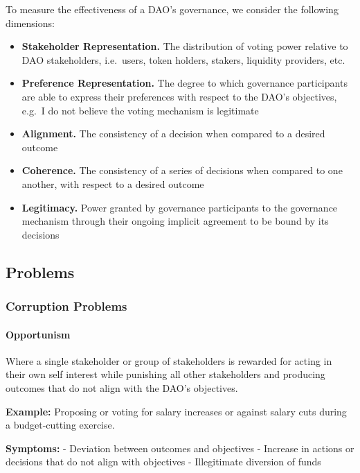 \documentclass[
]{article}
\providecommand{\tightlist}{%
  \setlength{\itemsep}{0pt}\setlength{\parskip}{0pt}}
\begin{document}
To measure the effectiveness of a DAO's governance, we consider the
following dimensions:

\begin{itemize}
\tightlist
\item
  \textbf{Stakeholder Representation.} The distribution of voting power
  relative to DAO stakeholders, i.e.~users, token holders, stakers,
  liquidity providers, etc.
\item
  \textbf{Preference Representation.} The degree to which governance
  participants are able to express their preferences with respect to the
  DAO's objectives, e.g.~I do not believe the voting mechanism is
  legitimate
\item
  \textbf{Alignment.} The consistency of a decision when compared to a
  desired outcome
\item
  \textbf{Coherence.} The consistency of a series of decisions when
  compared to one another, with respect to a desired outcome
\item
  \textbf{Legitimacy.} Power granted by governance participants to the
  governance mechanism through their ongoing implicit agreement to be
  bound by its decisions
\end{itemize}

\hypertarget{problems-1}{%
\subsection{Problems}\label{problems-1}}

\hypertarget{corruption-problems}{%
\subsubsection{Corruption Problems}\label{corruption-problems}}

\hypertarget{opportunism}{%
\paragraph{Opportunism}\label{opportunism}}

Where a single stakeholder or group of stakeholders is rewarded for
acting in their own self interest while punishing all other stakeholders
and producing outcomes that do not align with the DAO's objectives.

\textbf{Example:} Proposing or voting for salary increases or against
salary cuts during a budget-cutting exercise.

\textbf{Symptoms:} - Deviation between outcomes and objectives -
Increase in actions or decisions that do not align with objectives -
Illegitimate diversion of funds
\end{document}
